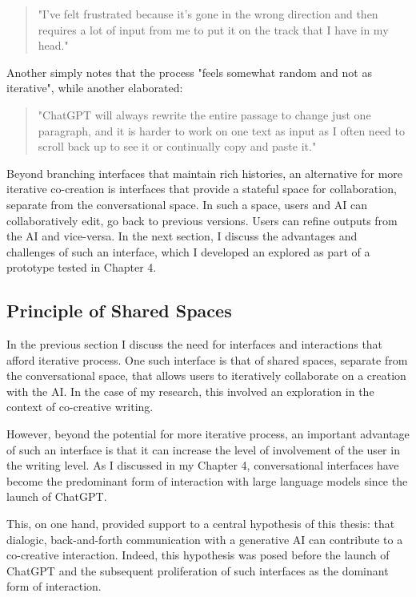 \begin{quote}
"I've felt frustrated because it's gone in the wrong direction and then requires a lot of input from me to put it on the track that I have in my head."
\end{quote}

Another simply notes that the process "feels somewhat random and not as iterative", while another elaborated:

\begin{quote}
"ChatGPT will always rewrite the entire passage to change just one paragraph, and it is harder to work on one text as input as I often need to scroll back up to see it or continually copy and paste it."
\end{quote}

Beyond branching interfaces that maintain rich histories, an alternative for more iterative co-creation is interfaces that provide a stateful space for collaboration, separate from the conversational space. In such a space, users and AI can collaboratively edit, go back to previous versions. Users can refine outputs from the AI and vice-versa. In the next section, I discuss the advantages and challenges of such an interface, which I developed an explored as part of a prototype tested in Chapter 4. 

\subsection{Principle of Shared Spaces}

In the previous section I discuss the need for interfaces and interactions that afford iterative process. One such interface is that of shared spaces, separate from the conversational space, that allows users to iteratively collaborate on a creation with the AI. In the case of my research, this involved an exploration in the context of co-creative writing. 

However, beyond the potential for more iterative process, an important advantage of such an interface is that it can increase the level of involvement of the user in the writing level. As I discussed in my Chapter 4, conversational interfaces have become the predominant form of interaction with large language models since the launch of ChatGPT. 

This, on one hand, provided support to a central hypothesis of this thesis: that dialogic, back-and-forth communication with a generative AI can contribute to a co-creative interaction. Indeed, this hypothesis was posed before the launch of ChatGPT and the subsequent proliferation of such interfaces as the dominant form of interaction. 


